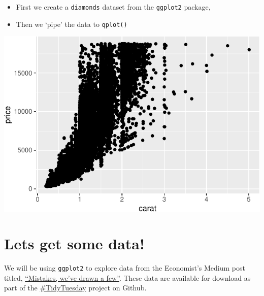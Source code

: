 \documentclass[letterpaper,12pt,twoside,]{pinp}
\providecommand{\tightlist}{%
  \setlength{\itemsep}{0pt}\setlength{\parskip}{0pt}}
\begin{document}
\begin{itemize}
\tightlist
\item
  First we create a \texttt{diamonds} dataset from the \texttt{ggplot2}
  package,
\item
  Then we `pipe' the data to \texttt{qplot()}
\end{itemize}

\begin{Shaded}
\begin{Highlighting}[]
\OtherTok{\textless{}{-}}\SpecialCharTok{::}
\SpecialCharTok{\%\textgreater{}\%} 
\SpecialCharTok{::}\NormalTok{(}
                  \NormalTok{)}
\end{Highlighting}
\end{Shaded}

\begin{center}\includegraphics{03-intro-to-ggplot2_files/figure-latex/diamonds-qplot-1} \end{center}

\hypertarget{lets-get-some-data}{%
\section{Lets get some data!}\label{lets-get-some-data}}

We will be using \texttt{ggplot2} to explore data from the Economist's
Medium post titled,
\href{https://medium.economist.com/mistakes-weve-drawn-a-few-8cdd8a42d368}{``Mistakes,
we've drawn a few''}. These data are available for download as part of
the \href{https://github.com/rfordatascience/tidytuesday}{\#TidyTuesday}
project on Github.
\end{document}
